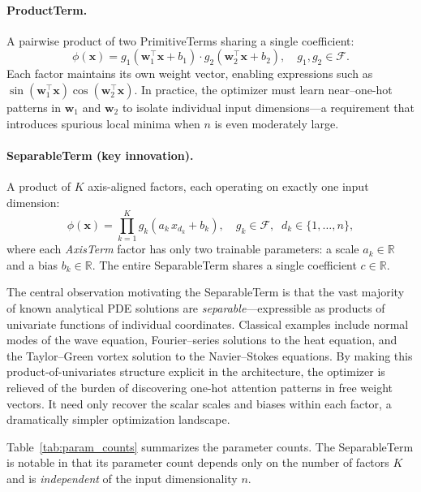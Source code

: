 \paragraph{ProductTerm.}
A pairwise product of two PrimitiveTerms sharing a single coefficient:
\begin{equation}
\label{eq:productterm}
    \phi(\mathbf{x}) = g_1\!\left(\mathbf{w}_1^\top \mathbf{x} + b_1\right)
    \cdot g_2\!\left(\mathbf{w}_2^\top \mathbf{x} + b_2\right),
    \quad g_1, g_2 \in \mathcal{F}.
\end{equation}
Each factor maintains its own weight vector, enabling expressions such as
$\sin(\mathbf{w}_1^\top \mathbf{x}) \cos(\mathbf{w}_2^\top \mathbf{x})$.
In practice, the optimizer must learn near--one-hot patterns in $\mathbf{w}_1$ and
$\mathbf{w}_2$ to isolate individual input dimensions---a requirement that
introduces spurious local minima when $n$ is even moderately large.

\paragraph{SeparableTerm (key innovation).}
A product of $K$ axis-aligned factors, each operating on exactly one input dimension:
\begin{equation}
\label{eq:separableterm}
    \phi(\mathbf{x}) = \prod_{k=1}^{K}
    g_k\!\left(a_k \, x_{d_k} + b_k\right),
    \quad g_k \in \mathcal{F},\;\;
    d_k \in \{1, \ldots, n\},
\end{equation}
where each \emph{AxisTerm} factor has only two trainable parameters: a scale
$a_k \in \mathbb{R}$ and a bias $b_k \in \mathbb{R}$.  The entire SeparableTerm
shares a single coefficient $c \in \mathbb{R}$.

\smallskip

The central observation motivating the SeparableTerm is that the vast majority of
known analytical PDE solutions are \emph{separable}---expressible as products of
univariate functions of individual coordinates.  Classical examples include
normal modes of the wave equation, Fourier--series solutions to the heat equation,
and the Taylor--Green vortex solution to the Navier--Stokes equations.
By making this product-of-univariates structure explicit in the architecture,
the optimizer is relieved of the burden of discovering one-hot attention patterns
in free weight vectors.  It need only recover the scalar scales and biases
within each factor, a dramatically simpler optimization landscape.

Table~\ref{tab:param_counts} summarizes the parameter counts.  The SeparableTerm
is notable in that its parameter count depends only on the number of factors $K$
and is \emph{independent} of the input dimensionality $n$.

